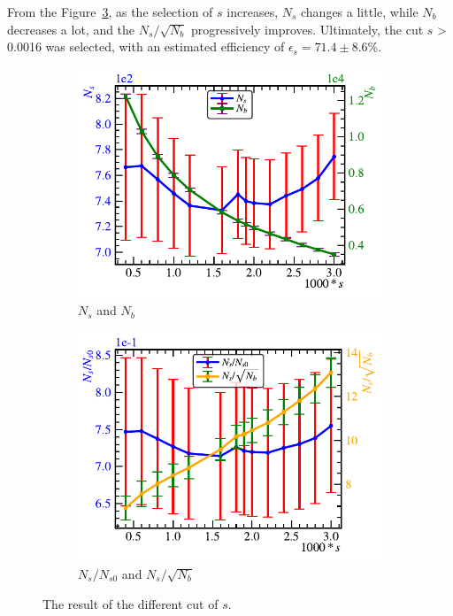 From the Figure~\ref{fast:ssummary}, as the selection of $s$ increases, $N_s$ changes a little, while $N_b$ decreases a lot, and the $N_s/\sqrt{N_b}$ progressively improves. Ultimately, the cut $s$ > 0.0016 was selected, with an estimated efficiency of  $\epsilon_{s}=71.4\pm8.6$\si{\percent}.
\begin{figure}[!htbp]
	\centering
	\begin{subfigure}{0.4\textwidth}
		\includegraphics[width=\textwidth]{neutrontag/fastrecon/scoreNsNb.pdf}
		\caption{$N_s$ and $N_b$}
		\label{fast:sNsNb}
	\end{subfigure}

	\begin{subfigure}{0.4\textwidth}
		\includegraphics[width=\textwidth]{neutrontag/fastrecon/scoreNssn.pdf}
		\caption{$N_s/N_{s0}$ and $N_s/\sqrt{N_b}$}
		\label{fast:sSN}
	\end{subfigure}
	\caption{The result of the different cut of $s$.}
	\label{fast:ssummary}
\end{figure}

